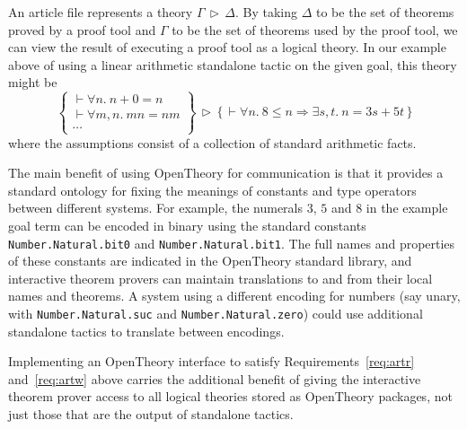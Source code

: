\documentclass{llncs}
\newcommand{\OpenTheory}{OpenTheory\xspace}
\newcommand{\theory}[2]{{#1}\,\triangleright\,{#2}}
\begin{document}
An article file represents a theory $\theory{\Gamma}{\Delta}$.
By taking $\Delta$ to be the set of theorems proved by a proof tool and $\Gamma$ to be the set of theorems used by the proof tool, we can view the result of executing a proof tool as a logical theory.
In our example above of using a linear arithmetic standalone tactic on the given goal, this theory might be
\[
\theory{\left\{\begin{array}{l}
\vdash\forall n.\ n + 0 = n \\
\vdash\forall m,n.\ mn = nm \\
\cdots
\end{array}\right\}}
{\bigl\{\,\vdash\forall n.\ 8\le n\Rightarrow\exists s,t.\ n = 3s + 5t\,\bigr\}}
\]
where the assumptions consist of a collection of standard arithmetic facts.


The main benefit of using \OpenTheory for communication is that it provides a standard ontology for fixing the meanings of constants and type operators between different systems.
For example, the numerals $3$, $5$ and $8$ in the example goal term can be encoded in binary using the standard constants \texttt{Number.Natural.bit0} and \texttt{Number.Natural.bit1}.
The full names and properties of these constants are indicated in the \OpenTheory standard library, and interactive theorem provers can maintain translations to and from their local names and theorems.
A system using a different encoding for numbers (say unary, with \texttt{Number.Natural.suc} and \texttt{Number.Natural.zero}) could use additional standalone tactics to translate between encodings.

Implementing an \OpenTheory interface to satisfy Requirements~\ref{req:artr} and~\ref{req:artw} above carries the additional benefit of giving the interactive theorem prover access to all logical theories stored as \OpenTheory packages, not just those that are the output of standalone tactics.
\end{document}
